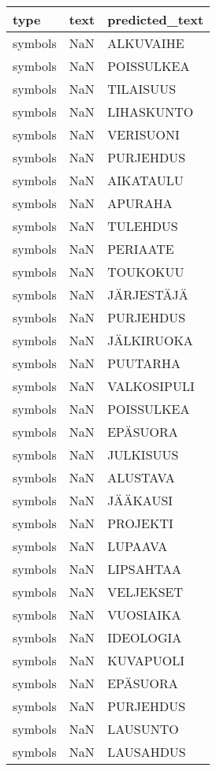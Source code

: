 \begin{tabular}{lll}
\toprule
    type & text &  predicted\_text \\
\midrule
 symbols &  NaN &       ALKUVAIHE \\
 symbols &  NaN &      POISSULKEA \\
 symbols &  NaN &       TILAISUUS \\
 symbols &  NaN &      LIHASKUNTO \\
 symbols &  NaN &       VERISUONI \\
 symbols &  NaN &       PURJEHDUS \\
 symbols &  NaN &       AIKATAULU \\
 symbols &  NaN &         APURAHA \\
 symbols &  NaN &        TULEHDUS \\
 symbols &  NaN &        PERIAATE \\
 symbols &  NaN &        TOUKOKUU \\
 symbols &  NaN &      JÄRJESTÄJÄ \\
 symbols &  NaN &       PURJEHDUS \\
 symbols &  NaN &      JÄLKIRUOKA \\
 symbols &  NaN &        PUUTARHA \\
 symbols &  NaN &     VALKOSIPULI \\
 symbols &  NaN &      POISSULKEA \\
 symbols &  NaN &        EPÄSUORA \\
 symbols &  NaN &       JULKISUUS \\
 symbols &  NaN &        ALUSTAVA \\
 symbols &  NaN &        JÄÄKAUSI \\
 symbols &  NaN &        PROJEKTI \\
 symbols &  NaN &         LUPAAVA \\
 symbols &  NaN &       LIPSAHTAA \\
 symbols &  NaN &       VELJEKSET \\
 symbols &  NaN &       VUOSIAIKA \\
 symbols &  NaN &       IDEOLOGIA \\
 symbols &  NaN &       KUVAPUOLI \\
 symbols &  NaN &        EPÄSUORA \\
 symbols &  NaN &       PURJEHDUS \\
 symbols &  NaN &        LAUSUNTO \\
 symbols &  NaN &       LAUSAHDUS \\

\end{tabular}
